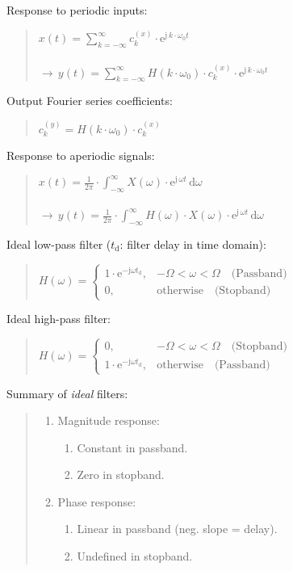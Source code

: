 \documentclass[fontsize=9pt,a4paper,twocolumn]{scrartcl}
\begin{document}
Response to periodic inputs:
\begin{quote}
	$\boxed{x(t)=\sum_{k=-\infty}^\infty c_k^{(x)}\cdot\mathrm{e}^{\mathrm{j}\,k\cdot\omega_0 t}}$\\\\
	$\boxed{\to\,y(t)=\sum_{k=-\infty}^\infty H(k\cdot\omega_0)\cdot c_k^{(x)}\cdot\mathrm{e}^{\mathrm{j}\,k\cdot\omega_0 t}}$
\end{quote}

Output Fourier series coefficients:
\begin{quote}
	$c_k^{(y)}=H(k\cdot\omega_0)\cdot c_k^{(x)}$
\end{quote}

Response to aperiodic signals:
\begin{quote}
	$\boxed{x(t)=\frac{1}{2\pi}\cdot\int_{-\infty}^\infty X(\omega)\cdot\mathrm{e}^{\mathrm{j}\,\omega t}\,\mathrm{d}\omega}$\\\\
	$\boxed{\to\,y(t)=\frac{1}{2\pi}\cdot\int_{-\infty}^\infty H(\omega)\cdot X(\omega)\cdot\mathrm{e}^{\mathrm{j}\,\omega t}\,\mathrm{d}\omega}$
\end{quote}

Ideal low-pass filter ($t_\mathrm{d}$: filter delay in time domain):
\begin{quote}
	$H(\omega)=\begin{cases}1\cdot\mathrm{e}^{-\mathrm{j}\omega t_\mathrm{d}},&-\Omega<\omega<\Omega \quad\text{(Passband)}\\0,&\text{otherwise} \quad\text{(Stopband)}\end{cases}$
\end{quote}

Ideal high-pass filter:
\begin{quote}
	$H(\omega)=\begin{cases}0, &-\Omega<\omega<\Omega \quad\text{(Stopband)}\\1\cdot\mathrm{e}^{-\mathrm{j}\omega t_\mathrm{d}}, &\text{otherwise}\quad\text{(Passband)}\end{cases}$
\end{quote}

Summary of \textit{ideal} filters:
\begin{quote}
	\begin{enumerate}
		\item Magnitude response:
			\begin{enumerate}
				\item Constant in passband.
				\item Zero in stopband.
			\end{enumerate}
		\item Phase response:
			\begin{enumerate}
				\item Linear in passband (neg. slope = delay).
				\item Undefined in stopband.
			\end{enumerate}
	\end{enumerate}
\end{quote}
\end{document}
